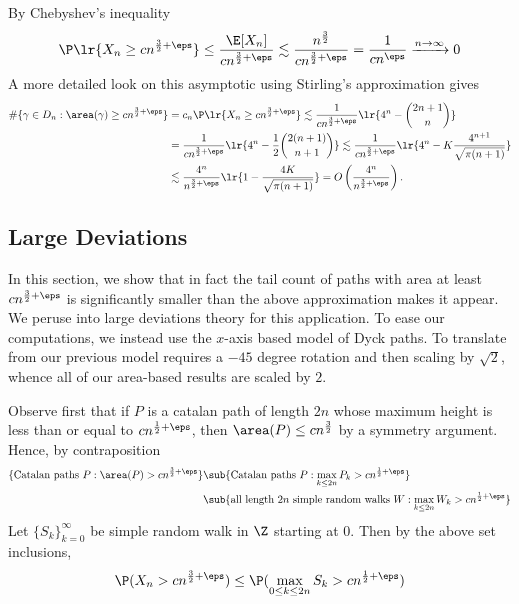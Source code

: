 \documentclass[12pt]{article}
\begin{document}
By Chebyshev's inequality 
\[
  \P\lr{X_{n} \geq cn^{\frac{3}{2}+\eps}} \leq \frac{\E[X_{n}]}{cn^{\frac{3}{2}+\eps}} \lesssim \frac{n^{\frac{3}{2}}}{cn^{\frac{3}{2}+\eps}} = \frac{1}{cn^\eps} \xrightarrow{n\to \infty}0
\]
A more detailed look on this asymptotic using Stirling's approximation gives
\begin{align*}
  \#\{\gamma\in D_{n} : \area(\gamma) \geq cn^{\frac{3}{2}+\eps}\} &= c_{n}\P\lr{X_{n} \geq cn^{\frac{3}{2}+\eps}} \lesssim \frac{1}{cn^{\frac{3}{2}+\eps}}\lr{4^{n}-\binom{2n+1}{n}} \\
  &=\frac{1}{cn^{\frac{3}{2}+\eps}} \lr{4^{n} - \frac{1}{2} \binom{2(n+1)}{n+1}} \lesssim \frac{1}{cn^{\frac{3}{2}+\eps}} \lr{4^{n} - K \frac{4^{n+1}}{\sqrt{\pi(n+1)}}} \\
  &\lesssim \frac{4^{n}}{n^{\frac{3}{2}+\eps}} \lr{1 - \frac{4K}{\sqrt{\pi(n+1)}}} = O\left(\frac{4^{n}}{n^{\frac{3}{2}+\eps}}\right).
\end{align*}

\subsection{Large Deviations}

In this section, we show that in fact the tail count of paths with area at least $ cn^{\frac{3}{2} +\eps} $ is significantly smaller than the above approximation makes it appear. We peruse into large deviations theory for this application. To ease our computations, we instead use the $ x $-axis based model of Dyck paths. To translate from our previous model requires a $ -45 $ degree rotation and then scaling by $ \sqrt{2} $, whence all of our area-based results are scaled by $ 2 $.

Observe first that if $ P $ is a catalan path of length $ 2n $ whose maximum height is less than or equal to $ cn^{\frac{1}{2}+\eps} $, then $ \area(P)\leq cn^{\frac{3}{2}} $ by a symmetry argument. Hence, by contraposition
\begin{align*}
  \{\text{Catalan paths }P: \area(P) > cn^{\frac{3}{2}+\eps}\} &\sub \{ \text{Catalan paths }P: \max_{k\leq2n} P_{k} > cn^{\frac{1}{2}+\eps}\} \\
  &\sub\{ \text{all length $ 2n $ simple random walks }W:\max_{k\leq2n} W_{k} > cn^{\frac{1}{2}+\eps}\}
\end{align*}
Let $ \{S_{k}\}_{k=0}^{\infty} $ be simple random walk in $ \Z $ starting at $ 0 $. Then by the above set inclusions,
\begin{align*}
  \P(X_{n} > c n^{\frac{3}{2}+\eps}) \leq \P(\max_{0\leq k\leq 2n}S_{k}>cn^{\frac{1}{2}+\eps} ) 
\end{align*}
\end{document}
